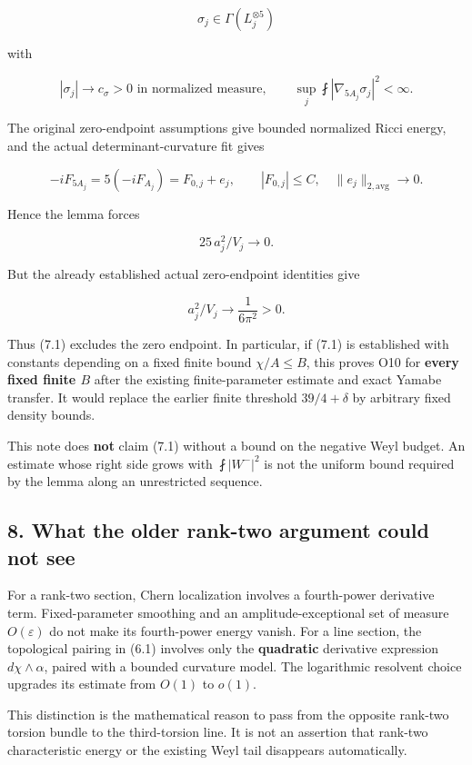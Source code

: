 \documentclass[11pt]{article}
\begin{document}
\[
\sigma_j\in\Gamma(L_j^{\otimes5})
\]

with

\[
|\sigma_j|\to c_\sigma>0\text{ in normalized measure},
\qquad \sup_j\fint|\nabla_{5A_j}\sigma_j|^2<\infty.
\tag{D.7.1}
\]

The original zero-endpoint assumptions give bounded normalized Ricci
energy, and the actual determinant-curvature fit gives

\[
-iF_{5A_j}=5(-iF_{A_j})=F_{0,j}+e_j,
\qquad |F_{0,j}|\le C,\quad\|e_j\|_{2,\mathrm{avg}}\to0.
\tag{D.7.2}
\]

Hence the lemma forces

\[
25\,a_j^2/V_j\longrightarrow0.
\tag{D.7.3}
\]

But the already established actual zero-endpoint identities give

\[
a_j^2/V_j\longrightarrow\frac1{6\pi^2}>0.
\tag{D.7.4}
\]

Thus (7.1) excludes the zero endpoint. In particular, if (7.1) is
established with constants depending on a fixed finite bound
\(\chi/A\le B\), this proves O10 for \textbf{every fixed finite \(B\)}
after the existing finite-parameter estimate and exact Yamabe transfer.
It would replace the earlier finite threshold \(39/4+\delta\) by
arbitrary fixed density bounds.

This note does \textbf{not} claim (7.1) without a bound on the negative
Weyl budget. An estimate whose right side grows with \(\fint|W^-|^2\) is
not the uniform bound required by the lemma along an unrestricted
sequence.

\hypertarget{what-the-older-rank-two-argument-could-not-see}{%
\subsection{8. What the older rank-two argument could not
see}\label{what-the-older-rank-two-argument-could-not-see}}

For a rank-two section, Chern localization involves a fourth-power
derivative term. Fixed-parameter smoothing and an amplitude-exceptional
set of measure \(O(\varepsilon)\) do not make its fourth-power energy
vanish. For a line section, the topological pairing in (6.1) involves
only the \textbf{quadratic} derivative expression \(d\chi\wedge\alpha\),
paired with a bounded curvature model. The logarithmic resolvent choice
upgrades its estimate from \(O(1)\) to \(o(1)\).

This distinction is the mathematical reason to pass from the opposite
rank-two torsion bundle to the third-torsion line. It is not an
assertion that rank-two characteristic energy or the existing Weyl tail
disappears automatically.
\end{document}
